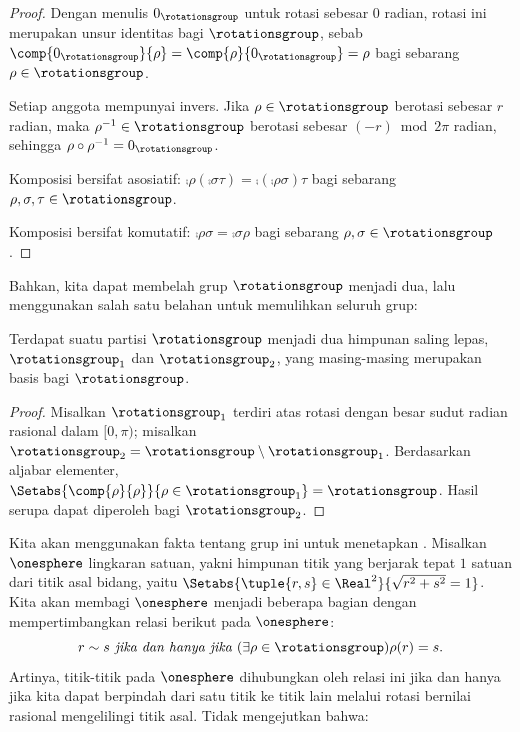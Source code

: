 \documentclass[../../../include/open-logic-section]{subfiles}
\begin{document}
\begin{proof}
Dengan menulis $0_{\rotationsgroup}$ untuk rotasi sebesar $0$ radian, rotasi
ini merupakan unsur identitas bagi $\rotationsgroup$, sebab
$\comp{0_{\rotationsgroup}}{\rho} = \comp{\rho}{0_{\rotationsgroup}} =
\rho$ bagi sebarang $\rho \in \rotationsgroup$.

Setiap anggota mempunyai invers. Jika $\rho \in \rotationsgroup$ berotasi
sebesar $r$ radian, maka $\rho^{-1} \in \rotationsgroup$ berotasi sebesar
$(-r)\bmod 2\pi$ radian, sehingga
$\rho \circ \rho^{-1} = 0_\rotationsgroup$.

Komposisi bersifat asosiatif:
$\comp{\rho}{(\comp{\sigma}{\tau})} =
\comp{(\comp{\rho}{\sigma})}{\tau}$ bagi sebarang
$\rho,\sigma,\tau\in\rotationsgroup$.

Komposisi bersifat komutatif:
$\comp{\rho}{\sigma}=\comp{\sigma}{\rho}$ bagi sebarang
$\rho,\sigma\in\rotationsgroup$.
\end{proof}

Bahkan, kita dapat membelah grup $\rotationsgroup$ menjadi dua, lalu
menggunakan salah satu belahan untuk memulihkan seluruh grup:

\begin{lem}
Terdapat suatu partisi $\rotationsgroup$ menjadi dua himpunan saling lepas,
$\rotationsgroup_{1}$ dan $\rotationsgroup_{2}$, yang masing-masing
merupakan basis bagi $\rotationsgroup$.
\end{lem}

\begin{proof}
Misalkan $\rotationsgroup_{1}$ terdiri atas rotasi dengan besar sudut radian
rasional dalam $[0,\pi)$; misalkan
$\rotationsgroup_{2}=\rotationsgroup\setminus\rotationsgroup_1$. Berdasarkan
aljabar elementer,
$\Setabs{\comp{\rho}{\rho}}{\rho\in\rotationsgroup_1}=\rotationsgroup$.
Hasil serupa dapat diperoleh bagi $\rotationsgroup_2$.
\end{proof}

Kita akan menggunakan fakta tentang grup ini untuk menetapkan
. Misalkan $\onesphere$ lingkaran satuan, yakni himpunan
titik yang berjarak tepat $1$ satuan dari titik asal bidang, yaitu
$\Setabs{\tuple{r,s}\in\Real^2}{\sqrt{r^2+s^2}=1}$. Kita akan membagi
$\onesphere$ menjadi beberapa bagian dengan mempertimbangkan relasi berikut
pada $\onesphere$:
\[
	r \sim s \emph{ jika dan hanya jika }
	(\exists \rho \in \rotationsgroup)\rho(r) = s.
\]
Artinya, titik-titik pada $\onesphere$ dihubungkan oleh relasi ini jika dan
hanya jika kita dapat berpindah dari satu titik ke titik lain melalui rotasi
bernilai rasional mengelilingi titik asal. Tidak mengejutkan bahwa:
\end{document}
